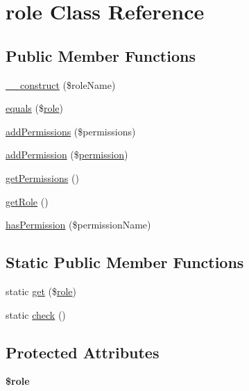 \hypertarget{classcommon_1_1user_1_1legacy_1_1role}{\section{role \-Class \-Reference}
\label{classcommon_1_1user_1_1legacy_1_1role}
}
\subsection*{\-Public \-Member \-Functions}
\begin{DoxyCompactItemize}
\item 
\hyperlink{classcommon_1_1user_1_1legacy_1_1role_a0696987c5e6ce3efd6da1ca1a8d47fcb}{\-\_\-\-\_\-construct} (\$role\-Name)
\item 
\hyperlink{classcommon_1_1user_1_1legacy_1_1role_a63a43d301f3974506cc8942dddc82dff}{equals} (\$\hyperlink{classcommon_1_1user_1_1legacy_1_1role}{role})
\item 
\hyperlink{classcommon_1_1user_1_1legacy_1_1role_a594d31710145cca1611de0f5ac26474b}{add\-Permissions} (\$permissions)
\item 
\hyperlink{classcommon_1_1user_1_1legacy_1_1role_acafe18e4082708191900b3a13406a115}{add\-Permission} (\$\hyperlink{classcommon_1_1user_1_1legacy_1_1permission}{permission})
\item 
\hyperlink{classcommon_1_1user_1_1legacy_1_1role_a98e8f81c4e0869a6adf4a36ca1a6860a}{get\-Permissions} ()
\item 
\hyperlink{classcommon_1_1user_1_1legacy_1_1role_a0b2e7098f1c48a7439a42bada5b69689}{get\-Role} ()
\item 
\hyperlink{classcommon_1_1user_1_1legacy_1_1role_acefac8c3f81c7bd751403a683623fcbf}{has\-Permission} (\$permission\-Name)
\end{DoxyCompactItemize}
\subsection*{\-Static \-Public \-Member \-Functions}
\begin{DoxyCompactItemize}
\item 
static \hyperlink{classcommon_1_1user_1_1legacy_1_1role_a08d78dc7411f3317df9509f962ecccf4}{get} (\$\hyperlink{classcommon_1_1user_1_1legacy_1_1role}{role})
\item 
static \hyperlink{classcommon_1_1user_1_1legacy_1_1role_a3a934bd1e982502106ee5dfac2e4e2ed}{check} ()
\end{DoxyCompactItemize}
\subsection*{\-Protected \-Attributes}
\begin{DoxyCompactItemize}
\item 
\hypertarget{classcommon_1_1user_1_1legacy_1_1role_a1ea903cca285c7c0b4c9203932100309}{{\bfseries \$role}}\label{classcommon_1_1user_1_1legacy_1_1role_a1ea903cca285c7c0b4c9203932100309}

\end{DoxyCompactItemize}


